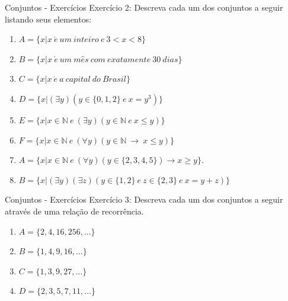 \documentclass[aspectratio=169]{beamer}
\begin{document}
\begin{frame}{Conjuntos - Exercícios}
    Exercício 2: Descreva cada um dos conjuntos a seguir listando seus elementos:
    \vspace{4mm}
\begin{enumerate}
    \item $A=\{x|x ~ \acute{e} ~ um ~ inteiro ~ e ~ 3 < x < 8\}$
    \item $B=\{x|x ~ \acute{e} ~ um ~ m\hat{e}s ~ com ~ exatamente ~ 30 ~ dias\}$
    \item $C=\{x|x ~ \acute{e} ~ a ~ capital ~ do ~ Brasil\}$
    \item $D=\{x|(\exists y)(y \in \{0,1,2\} ~ e ~ x = y^3)\}$
    \item $E=\{x|x \in \mathbb{N} ~ e ~ (\exists y)(y \in \mathbb{N} ~ e ~ x \leq y)\}$
    \item $F=\{x|x \in \mathbb{N} ~ e ~ (\forall y)(y \in \mathbb{N} ~ \rightarrow ~ x \leq y)\}$
    \item $A = \{x | x \in \mathbb{N} ~ e ~ (\forall y)(y \in \{2, 3, 4, 5\}) \rightarrow x \geq y\}.$
    \item $B = \{x | (\exists y)(\exists z)(y \in \{1,2\} ~ e ~ z \in \{2,3\} ~ e ~ x=y+z)\}$
\end{enumerate}    
\end{frame}

\begin{frame}{Conjuntos - Exercícios}
    Exercício 3: Descreva cada um dos conjuntos a seguir através de uma relação de recorrência.
    \vspace{4mm}
\begin{enumerate}
    \item $A=\{2,4,16,256,...\}$
    \item $B=\{1,4,9,16,...\}$
    \item $C=\{1,3,9,27,...\}$
    \item $D=\{2,3,5,7,11,...\}$
\end{enumerate}    
\end{frame}
\end{document}
